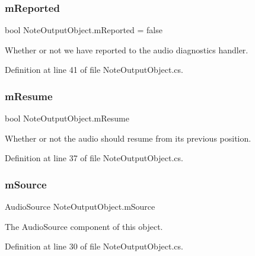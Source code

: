 \subsubsection{\texorpdfstring{m\+Reported}{mReported}}
{\footnotesize\ttfamily bool Note\+Output\+Object.\+m\+Reported = false\hspace{0.3cm}{\ttfamily [private]}}



Whether or not we have reported to the audio diagnostics handler. 



Definition at line 41 of file Note\+Output\+Object.\+cs.

\mbox{\label{group___n_o_o_priv_var_ga1f7a31f1aefc1633f1f435e3438a1efb}} 
\subsubsection{\texorpdfstring{m\+Resume}{mResume}}
{\footnotesize\ttfamily bool Note\+Output\+Object.\+m\+Resume\hspace{0.3cm}{\ttfamily [private]}}



Whether or not the audio should resume from its previous position. 



Definition at line 37 of file Note\+Output\+Object.\+cs.

\mbox{\label{group___n_o_o_priv_var_gad5e14a91b348e61166dbf6b6cf13649c}} 
\subsubsection{\texorpdfstring{m\+Source}{mSource}}
{\footnotesize\ttfamily Audio\+Source Note\+Output\+Object.\+m\+Source\hspace{0.3cm}{\ttfamily [private]}}



The Audio\+Source component of this object. 



Definition at line 30 of file Note\+Output\+Object.\+cs.

